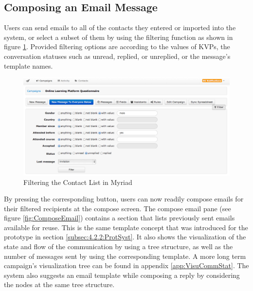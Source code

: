\clearpage

\subsection{Composing an Email Message}
\label{subsec:5.2.4:CompEmaiMess}

Users can send emails to all of the contacts they entered or imported into the system, or select a subset of them by using the filtering function as shown in figure \ref{fig:ContactFilters}. Provided filtering options are according to the values of \ac{KVP}s, the conversation statuses such as unread, replied, or unreplied, or the message's template names.

\begin{figure}[htbp]
	\centering
	\includegraphics[width=1.00\textwidth]{imgs/ContactFilters.png}
	\caption[Filtering the Contact List in Myriad]{Filtering the Contact List in Myriad}
	\label{fig:ContactFilters}
\end{figure}

By pressing the corresponding button, users can now readily compose emails for their filtered recipients at the compose screen. The compose email pane (see figure \ref{fig:ComposeEmail}) contains a section that lists previously sent emails available for reuse. This is the same template concept that was introduced for the prototype in section \ref{subsec:4.2.2:ProtSyst}. It also shows the visualization of the state and flow of the communication by using a tree structure, as well as the number of messages sent by using the corresponding template. A more long term campaign's visualization tree can be found in appendix \ref{app:VisuCommStat}. The system also suggests an email template while composing a reply by considering the nodes at the same tree structure.
\vspace{1cm}

